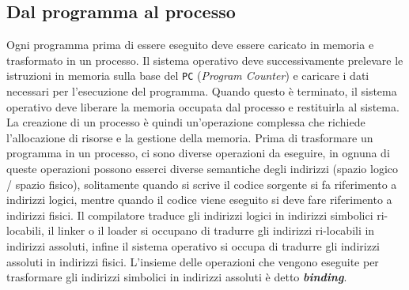     \subsection{Dal programma al processo}
        Ogni programma prima di essere eseguito deve essere caricato in memoria e trasformato in un processo. Il sistema operativo deve successivamente prelevare le istruzioni in memoria sulla base del \texttt{PC} (\textit{Program Counter}) e caricare i dati necessari per l'esecuzione del programma. Quando questo è terminato, il sistema operativo deve liberare la memoria occupata dal processo e restituirla al sistema. La creazione di un processo è quindi un'operazione complessa che richiede l'allocazione di risorse e la gestione della memoria.\newline
        Prima di trasformare un programma in un processo, ci sono diverse operazioni da eseguire, in ognuna di queste operazioni possono esserci diverse semantiche degli indirizzi (spazio logico / spazio fisico), solitamente quando si scrive il codice sorgente si fa riferimento a indirizzi logici, mentre quando il codice viene eseguito si deve fare riferimento a indirizzi fisici.\newline
        Il compilatore traduce gli indirizzi logici in indirizzi simbolici ri-locabili, il linker o il loader si occupano di tradurre gli indirizzi ri-locabili in indirizzi assoluti, infine il sistema operativo si occupa di tradurre gli indirizzi assoluti in indirizzi fisici.\newline
        L'insieme delle operazioni che vengono eseguite per trasformare gli indirizzi simbolici in indirizzi assoluti è detto \textbf{\textit{binding}}.
